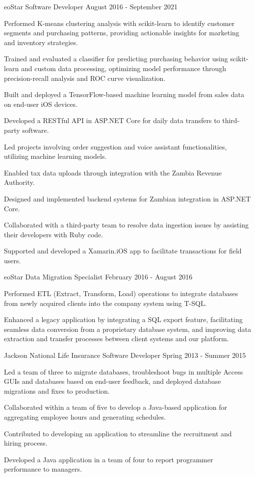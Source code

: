 \documentclass{../styles/resume}
\begin{document}
\subsectionpositiondate
    {eoStar}
    {Software Developer}
    {August 2016 - September 2021}
\resumesublistbegin
    \item Performed K-means clustering analysis with scikit-learn to identify customer segments and purchasing patterns, providing actionable insights for marketing and inventory strategies.
    \item Trained and evaluated a classifier for predicting purchasing behavior using scikit-learn and custom data processing, optimizing model performance through precision-recall analysis and ROC curve visualization.
    \item Built and deployed a TensorFlow-based machine learning model from sales data on end-user iOS devices.
    \item Developed a RESTful API in ASP.NET Core for daily data transfers to third-party software.
    \item Led projects involving order suggestion and voice assistant functionalities, utilizing machine learning models.
    \item Enabled tax data uploads through integration with the Zambia Revenue Authority.
    \item Designed and implemented backend systems for Zambian integration in ASP.NET Core.
    \item Collaborated with a third-party team to resolve data ingestion issues by assisting their developers with Ruby code.
    \item Supported and developed a Xamarin.iOS app to facilitate transactions for field users.
\resumesublistend

\subsectionpositiondate
    {eoStar}
    {Data Migration Specialist}
    {February 2016 - August 2016}
\resumesublistbegin
    \item Performed ETL (Extract, Transform, Load) operations to integrate databases from newly acquired clients into the company system using T-SQL.
    \item Enhanced a legacy \cpp application by integrating a SQL export feature, facilitating seamless data conversion from a proprietary database system, and improving data extraction and transfer processes between client systems and our platform.
\resumesublistend

\subsectionpositiondate
    {Jackson National Life Insurance}
    {Software Developer}
    {Spring 2013 - Summer 2015}
\resumesublistbegin
    \item Led a team of three to migrate databases, troubleshoot bugs in multiple Access GUIs and databases based on end-user feedback, and deployed database migrations and fixes to production.
    \item Collaborated within a team of five to develop a Java-based application for aggregating employee hours and generating schedules.
    \item Contributed to developing an application to streamline the recruitment and hiring process.
    \item Developed a Java application in a team of four to report programmer performance to managers.
\resumesublistend
\end{document}
